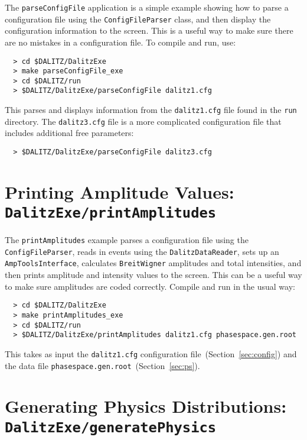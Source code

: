 \documentclass[10pt]{article}
\begin{document}
The {\tt parseConfigFile} application is a simple example showing how to parse a configuration file using the {\tt ConfigFileParser} class, and then display the configuration information to the screen.  This is a useful way to make sure there are no mistakes in a configuration file.  To compile and run, use:
\begin{verbatim}
  > cd $DALITZ/DalitzExe
  > make parseConfigFile_exe
  > cd $DALITZ/run
  > $DALITZ/DalitzExe/parseConfigFile dalitz1.cfg
\end{verbatim}
This parses and displays information from the {\tt dalitz1.cfg} file found in the {\tt run} directory.  The {\tt dalitz3.cfg} file is a more complicated configuration file that includes additional free parameters:
\begin{verbatim}
  > $DALITZ/DalitzExe/parseConfigFile dalitz3.cfg
\end{verbatim}

\section{Printing Amplitude Values: \\
{\tt DalitzExe/printAmplitudes}}

The {\tt printAmplitudes} example parses a configuration file using the {\tt ConfigFileParser}, reads in events using the {\tt DalitzDataReader}, sets up an {\tt AmpToolsInterface}, calculates {\tt BreitWigner} amplitudes and total intensities, and then prints amplitude and intensity values to the screen. This can be a useful way to make sure amplitudes are coded correctly.  Compile and run in the usual way:
\begin{verbatim}
  > cd $DALITZ/DalitzExe
  > make printAmplitudes_exe
  > cd $DALITZ/run
  > $DALITZ/DalitzExe/printAmplitudes dalitz1.cfg phasespace.gen.root
\end{verbatim}
This takes as input the {\tt dalitz1.cfg} configuration file~(Section~\ref{sec:config}) and the data file {\tt phasespace.gen.root}~(Section~\ref{sec:ps}).

\section{Generating Physics Distributions: \\ 
{\tt DalitzExe/generatePhysics}}
\label{sec:physics}
\end{document}
